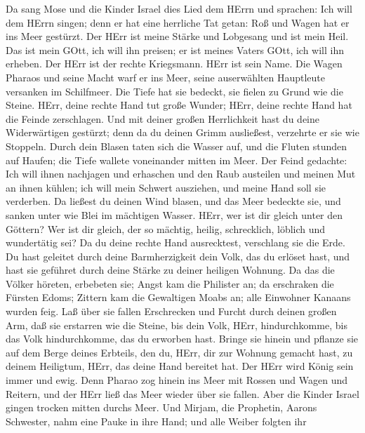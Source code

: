  Da sang Mose und die Kinder Israel dies Lied dem HErrn und
sprachen: Ich will dem HErrn singen; denn er hat eine herrliche Tat
getan: Roß und Wagen hat er ins Meer gestürzt.  Der HErr ist
meine Stärke und Lobgesang und ist mein Heil. Das ist mein GOtt, ich
will ihn preisen; er ist meines Vaters GOtt, ich will ihn erheben.
 Der HErr ist der rechte Kriegsmann. HErr ist sein Name.
 Die Wagen Pharaos und seine Macht warf er ins Meer, seine
auserwählten Hauptleute versanken im Schilfmeer.  Die Tiefe
hat sie bedeckt, sie fielen zu Grund wie die Steine.  HErr,
deine rechte Hand tut große Wunder; HErr, deine rechte Hand hat die
Feinde zerschlagen.  Und mit deiner großen Herrlichkeit hast
du deine Widerwärtigen gestürzt; denn da du deinen Grimm ausließest,
verzehrte er sie wie Stoppeln.  Durch dein Blasen taten sich
die Wasser auf, und die Fluten stunden auf Haufen; die Tiefe wallete
voneinander mitten im Meer.  Der Feind gedachte: Ich will
ihnen nachjagen und erhaschen und den Raub austeilen und meinen Mut an
ihnen kühlen; ich will mein Schwert ausziehen, und meine Hand soll sie
verderben.  Da ließest du deinen Wind blasen, und das Meer
bedeckte sie, und sanken unter wie Blei im mächtigen Wasser.
 HErr, wer ist dir gleich unter den Göttern? Wer ist dir
gleich, der so mächtig, heilig, schrecklich, löblich und wundertätig
sei?  Da du deine rechte Hand ausrecktest, verschlang sie
die Erde.  Du hast geleitet durch deine Barmherzigkeit dein
Volk, das du erlöset hast, und hast sie geführet durch deine Stärke zu
deiner heiligen Wohnung.  Da das die Völker höreten,
erbebeten sie; Angst kam die Philister an;  da erschraken
die Fürsten Edoms; Zittern kam die Gewaltigen Moabs an; alle Einwohner
Kanaans wurden feig.  Laß über sie fallen Erschrecken und
Furcht durch deinen großen Arm, daß sie erstarren wie die Steine, bis
dein Volk, HErr, hindurchkomme, bis das Volk hindurchkomme, das du
erworben hast.  Bringe sie hinein und pflanze sie auf dem
Berge deines Erbteils, den du, HErr, dir zur Wohnung gemacht hast, zu
deinem Heiligtum, HErr, das deine Hand bereitet hat.  Der
HErr wird König sein immer und ewig.  Denn Pharao zog
hinein ins Meer mit Rossen und Wagen und Reitern, und der HErr ließ das
Meer wieder über sie fallen. Aber die Kinder Israel gingen trocken
mitten durchs Meer.  Und Mirjam, die Prophetin, Aarons
Schwester, nahm eine Pauke in ihre Hand; und alle Weiber folgten ihr
